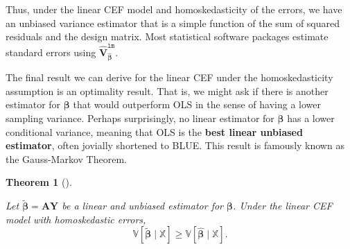\documentclass[
  13pt,
  letterpaper,
  DIV=11,
  numbers=noendperiod]{scrreprt}
\newcommand{\mb}{\bm}
\newcommand{\V}{\mathbb{V}}
\newcommand{\Xmat}{\mathbb{X}}
\newcommand{\bfbeta}{\mb{\beta}}
\newcommand{\bhat}{\widehat{\mb{\beta}}}
\theoremstyle{plain}
\newtheorem{theorem}{Theorem}[chapter]
\theoremstyle{plain}
\theoremstyle{definition}
\theoremstyle{definition}
\theoremstyle{remark}
\begin{document}
Thus, under the linear CEF model and homoskedasticity of the errors, we
have an unbiased variance estimator that is a simple function of the sum
of squared residuals and the design matrix. Most statistical software
packages estimate standard errors using
\(\widehat{\mb{V}}^{\texttt{lm}}_{\bhat}\).

The final result we can derive for the linear CEF under the
homoskedasticity assumption is an optimality result. That is, we might
ask if there is another estimator for \(\bfbeta\) that would outperform
OLS in the sense of having a lower sampling variance. Perhaps
surprisingly, no linear estimator for \(\bfbeta\) has a lower
conditional variance, meaning that OLS is the \textbf{best linear
unbiased estimator}, often jovially shortened to BLUE. This result is
famously known as the Gauss-Markov Theorem.

\begin{theorem}[]\protect\hypertarget{thm-gauss-markov}{}\label{thm-gauss-markov}

Let \(\widetilde{\bfbeta} = \mb{AY}\) be a linear and unbiased estimator
for \(\bfbeta\). Under the linear CEF model with homoskedastic errors,
\[
\V[\widetilde{\bfbeta}\mid \Xmat] \geq \V[\bhat \mid \Xmat]. 
\]

\end{theorem}
\end{document}
